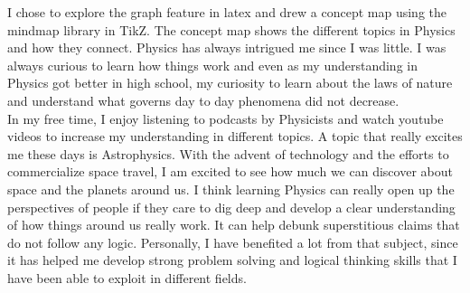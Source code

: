 \documentclass[landscape]{article}
\begin{document}
I chose to explore the graph feature in latex and drew a concept map using the mindmap library in TikZ. The concept map shows the different topics in Physics and how they connect. Physics has always intrigued me since I was little. I was always curious to learn how things work and even as my understanding in Physics got better in high school, my curiosity to learn about the laws of nature and understand what governs day to day phenomena did not decrease.\\

In my free time, I enjoy listening to podcasts by Physicists and watch youtube videos to increase my understanding in different topics. A topic that really excites me these days is Astrophysics. With the advent of technology and the efforts to commercialize space travel, I am excited to see how much we can discover about space and the planets around us. I think learning Physics can really open up the perspectives of people if they care to dig deep and develop a clear understanding of how things around us really work. It can help debunk superstitious claims that do not follow any logic. Personally, I have benefited a lot from that subject, since it has helped me develop strong problem solving and logical thinking skills that I have been able to exploit in different fields.
\end{document}
